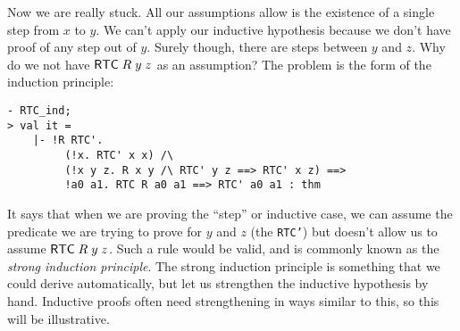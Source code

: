 \documentclass[12pt]{article}
\begin{document}
Now we are really stuck.  All our assumptions allow is the existence
of a single step from $x$ to $y$.  We can't apply our inductive
hypothesis because we don't have proof of any step out of $y$.  Surely
though, there are steps between $y$ and $z$.  Why do we not have
${\sf RTC}\;R\;y\;z$ as an assumption?  The problem is the form of the
induction principle:
\begin{session}\begin{verbatim}
- RTC_ind;
> val it =
    |- !R RTC'.
         (!x. RTC' x x) /\
         (!x y z. R x y /\ RTC' y z ==> RTC' x z) ==>
         !a0 a1. RTC R a0 a1 ==> RTC' a0 a1 : thm
\end{verbatim}\end{session}
    It says that when we are proving the ``step'' or inductive case,
    we can assume the predicate we are trying to prove for $y$ and $z$
    (the \texttt{RTC'}) but doesn't allow us to assume
    ${\sf RTC}\;R\;y\;z$.  Such a rule would be valid, and is commonly
    known as the \emph{strong induction principle}.  The strong
    induction principle is something that we could derive
    automatically, but let us strengthen the inductive hypothesis by
    hand.  Inductive proofs often need strengthening in ways similar
    to this, so this will be illustrative.
\end{document}
